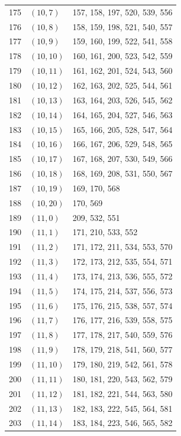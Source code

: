 \documentclass{article}
\begin{document}
\begin{longtable}{lll}
  175 & \((10, 7)\) & 157, 158, 197, 520, 539, 556 \\
  176 & \((10, 8)\) & 158, 159, 198, 521, 540, 557 \\
  177 & \((10, 9)\) & 159, 160, 199, 522, 541, 558 \\
  178 & \((10, 10)\) & 160, 161, 200, 523, 542, 559 \\
  179 & \((10, 11)\) & 161, 162, 201, 524, 543, 560 \\
  180 & \((10, 12)\) & 162, 163, 202, 525, 544, 561 \\
  181 & \((10, 13)\) & 163, 164, 203, 526, 545, 562 \\
  182 & \((10, 14)\) & 164, 165, 204, 527, 546, 563 \\
  183 & \((10, 15)\) & 165, 166, 205, 528, 547, 564 \\
  184 & \((10, 16)\) & 166, 167, 206, 529, 548, 565 \\
  185 & \((10, 17)\) & 167, 168, 207, 530, 549, 566 \\
  186 & \((10, 18)\) & 168, 169, 208, 531, 550, 567 \\
  187 & \((10, 19)\) & 169, 170, 568 \\
  188 & \((10, 20)\) & 170, 569 \\
  189 & \((11, 0)\) & 209, 532, 551 \\
  190 & \((11, 1)\) & 171, 210, 533, 552 \\
  191 & \((11, 2)\) & 171, 172, 211, 534, 553, 570 \\
  192 & \((11, 3)\) & 172, 173, 212, 535, 554, 571 \\
  193 & \((11, 4)\) & 173, 174, 213, 536, 555, 572 \\
  194 & \((11, 5)\) & 174, 175, 214, 537, 556, 573 \\
  195 & \((11, 6)\) & 175, 176, 215, 538, 557, 574 \\
  196 & \((11, 7)\) & 176, 177, 216, 539, 558, 575 \\
  197 & \((11, 8)\) & 177, 178, 217, 540, 559, 576 \\
  198 & \((11, 9)\) & 178, 179, 218, 541, 560, 577 \\
  199 & \((11, 10)\) & 179, 180, 219, 542, 561, 578 \\
  200 & \((11, 11)\) & 180, 181, 220, 543, 562, 579 \\
  201 & \((11, 12)\) & 181, 182, 221, 544, 563, 580 \\
  202 & \((11, 13)\) & 182, 183, 222, 545, 564, 581 \\
  203 & \((11, 14)\) & 183, 184, 223, 546, 565, 582 \\

\end{longtable}
\end{document}
